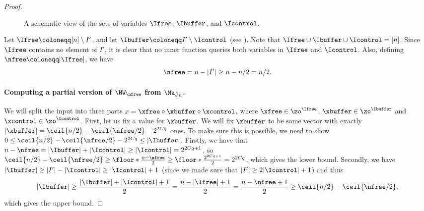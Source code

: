 \begin{proof}
\begin{figure}[h]
\centering 


\caption{A schematic view of the sets of variables $\Ifree$, $\Ibuffer$, and $\Icontrol$.}
\label{fig:free-buffer-control}
\end{figure}

Let $\Ifree \coloneqq [n] \setminus I'$, and let $\Ibuffer \coloneqq  I' \setminus \Icontrol$ (see ).
Note that $\Ifree \cup \Ibuffer \cup \Icontrol = [n]$.
Since $\Ifree$ contains no element of $I'$, it is clear that no inner function queries both variables in $\Ifree$ and $\Icontrol$.
Also, defining $\nfree \coloneqq |\Ifree|$, we have
\begin{equation}
    \label{eq:nfree}
    \nfree = n - |I'| \geq n - n/2 = n/2.
\end{equation}

\paragraph*{Computing a partial version of $\HW_{\nfree}$ from $\Maj_n$.}
We will split the input into three parts $x = \xfree \circ \xbuffer \circ \xcontrol$, where $\xfree \in \zo^{\Ifree}$, $\xbuffer \in \zo^{\Ibuffer}$ and $\xcontrol \in \zo^{\Icontrol}$.
First, let us fix a value for $\xbuffer$.
We will fix $\xbuffer$ to be some vector with exactly $|\xbuffer| = \ceil{n/2}-\ceil{\nfree/2} - 2^{2Cq}$ ones.
To make sure this is possible, we need to show $0 \leq \ceil{n/2}-\ceil{\nfree/2} - 2^{2Cq} \leq |\Ibuffer|$.
Firstly, we have that
$n-\nfree = |\Ibuffer| + |\Icontrol| \geq |\Icontrol| = 2^{2Cq+1}$,
so $\ceil{n/2}-\ceil{\nfree/2} \geq \floor*{\frac{n - \nfree}{2}} \geq \floor*{\frac{2^{2Cq+1}}{2}} = 2^{2Cq}$, which gives the lower bound.
Secondly, we have $|\Ibuffer| \geq |I'| - |\Icontrol| \geq |\Icontrol|+1$ (since we made sure that $|I'| \geq 2|\Icontrol|+1$) and thus
\[
|\Ibuffer| \geq \frac{|\Ibuffer|+|\Icontrol|+1}{2} = \frac{n-|\Ifree|+1}{2} = \frac{n-\nfree+1}{2} \geq \ceil{n/2} - \ceil{\nfree/2},
\]
which gives the upper bound.


\end{proof}
